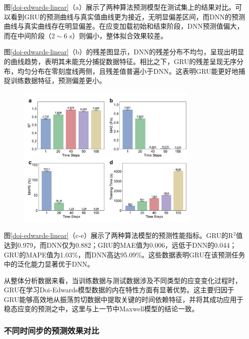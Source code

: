 图\ref{doi-edwards-linear}（a）展示了两种算法预测模型在测试集上的结果对比。可以看到GRU的预测曲线与真实值曲线更为接近，无明显偏差区间，而DNN的预测曲线与真实曲线存在明显偏差。在应变加载初始和结束阶段，DNN预测值偏大，而在中间阶段（$2\sim6$ s）则偏小，整体拟合效果较差。

图\ref{doi-edwards-linear}（b）的残差图显示，DNN的残差分布不均匀，呈现出明显的曲线趋势，表明其未能充分捕捉数据特征。相比之下，GRU的残差呈现无序分布，均匀分布在零刻度线两侧，且残差值普遍小于DNN。这表明GRU能更好地捕捉训练数据特征，预测偏差更小。
\begin{figure}[htbp]
  \centering
  \includegraphics[width=0.8\textwidth]{Fig/doi-edwards-timesteps-metrics.pdf}
\end{figure}
图\ref{doi-edwards-linear}（c-e）展示了两种算法模型的预测性能指标。GRU的R$^2$值达到0.979，而DNN仅为0.882；GRU的MAE值为0.006，远低于DNN的0.044；GRU的MAPE值为1.03\%，而DNN高达95.09\%。这些数据表明GRU在该预测任务中的泛化能力显著优于DNN。

从整体分析数据来看，当训练数据与测试数据涉及不同类型的应变变化过程时，GRU在学习Doi-Edwards模型数据的内在特性方面有显著优势。这主要归因于GRU能够高效地从振荡剪切数据中提取关键的时间依赖特征，并将其成功应用于稳态应变的预测之中，这里与上一节中Maxwell模型的结论一致。

\subsubsection{不同时间步的预测效果对比}

